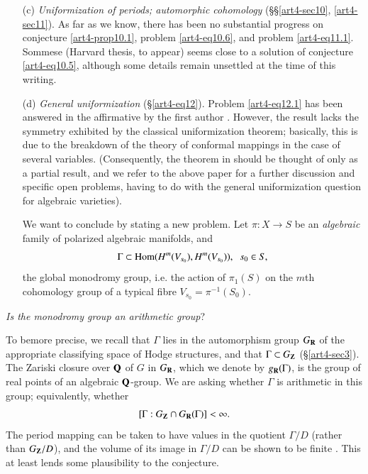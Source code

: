 \begin{itemize}
\item[(c)] \textit{Uniformization of periods; automorphic cohomology } (\S\S \ref{art4-sec10}, \ref{art4-sec11}). As far as we know, there has been no substantial progress on conjecture \ref{art4-prop10.1}, problem \eqref{art4-eq10.6}, and problem \eqref{art4-eq11.1}. Sommese (Harvard thesis, to appear) seems close to a solution of conjecture \ref{art4-eq10.5}, although some details remain unsettled at the time of this writing.

\item[(d)] \textit{General uniformization} (\S\ref{art4-eq12}). Problem \ref{art4-eq12.1} has been answered in the affirmative by the first author \cite{art4-key23}. However, the result lacks the symmetry exhibited by the classical uniformization theorem; basically, this is due to the breakdown of the theory of conformal mappings in the case of several variables. (Consequently, the theorem in \cite{art4-key23} should be thought of only as a partial result, and we refer to the above paper for a further discussion and specific open problems, having to do with the general uniformization question for algebraic varieties).

We want to conclude by stating a new problem. Let $\pi : X \to S$ be an \textit{algebraic} family of polarized algebraic manifolds, and 
$$
\Gamma \subset \operatorname{Hom} (H^m (V_{s_0}), H^m (V_{s_0})), \;\; s_0 \in S,
$$
the global monodromy group, i.e. the action of $\pi_1 (S)$ on the $m$th cohomology group of a typical fibre $V_{s_0} = \pi^{-1}(S_0)$.
\end{itemize}

\begin{problem}
\textit{Is the monodromy group an arithmetic group}?

To be\pageoriginale more precise, we recall that $\Gamma$ lies in the automorphism group $G_{\mathbf{R}}$ of the appropriate classifying space of Hodge structures, and that $\Gamma \subset G_{\mathbf{Z}}$ (\cf \S \ref{art4-sec3}). The  Zariski closure over $\mathbf{Q}$ of $G$ in $G_{\mathbf{R}}$, which we denote by $g_{\mathbf{R}} (\Gamma)$, is the group of real points of an algebraic $\mathbf{Q}$-group. We are asking whether $\Gamma$ is arithmetic in this group; equivalently, whether
$$
[\Gamma : G_{\mathbf{Z}} \cap G_{\mathbf{R}} (\Gamma)] < \infty.
$$
The period mapping can be taken to have values in the quotient $\Gamma / D$ (rather than $G_{\mathbf{Z}} / D$), and the volume of its image in $\Gamma / D$ can be shown to be finite \cite{art4-key19}. This at least lends some plausibility to the conjecture.
\end{problem}

